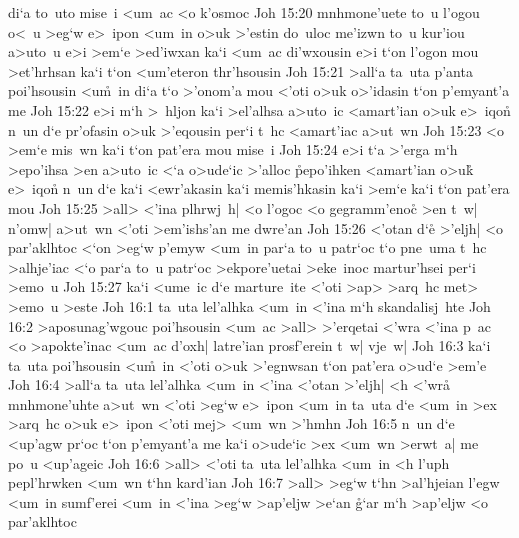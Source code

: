 di`a
to~uto
mise~i
<um~ac
<o
k'osmoc\bibvsend
\vs Joh 15:20
mnhmone'uete
to~u
l'ogou
o<~u
>eg`w
e>~ipon
<um~in
o>uk
>'estin
do~uloc
me'izwn
to~u
kur'iou
a>uto~u
e>i
>em`e
>ed'iwxan
ka`i
<um~ac
di'wxousin
e>i
t`on
l'ogon
mou
>et'hrhsan
ka`i
t`on
<um'eteron
thr'hsousin\bibvsend
\vs Joh 15:21
>all`a
ta~uta
p'anta
poi'hsousin
<u\r{m}~in
di`a
t`o
>'onom'a
mou
<'oti
o>uk
o>'idasin
t`on
p'emyant'a
me\bibvsend
\vs Joh 15:22
e>i
m`h
>~hljon
ka`i
>el'alhsa
a>uto~ic
<amart'ian
o>uk
e>~iqo\r{n}
n~un
d`e
pr'ofasin
o>uk
>'eqousin
per`i
t~hc
<amart'iac
a>ut~wn\bibvsend
\vs Joh 15:23
<o
>em`e
mis~wn
ka`i
t`on
pat'era
mou
mise~i\bibvsend
\vs Joh 15:24
e>i
t`a
>'erga
m`h
>epo'ihsa
>en
a>uto~ic
<`a
o>ude`ic
>'alloc
\r{p}epo'ihken
<amart'ian
o>u\r{k}
e>~iqo\r{n}
n~un
d`e
ka`i
<ewr'akasin
ka`i
memis'hkasin
ka`i
>em`e
ka`i
t`on
pat'era
mou\bibvsend
\vs Joh 15:25
>all>
<'ina
plhrwj~h|
<o
l'ogoc
<o
gegramm'enoc\r{}
>en
t~w|
n'omw|
a>ut~wn
<'oti
>em'ishs'an
me
dwre'an\bibvsend
\vs Joh 15:26
<'otan
d`e\r{}
>'eljh|
<o
par'aklhtoc
<`on
>eg`w
p'emyw
<um~in
par`a
to~u
patr`oc
t`o
pne~uma
t~hc
>alhje'iac
<`o
par`a
to~u
patr`oc
>ekpore'uetai
>eke~inoc
martur'hsei
per`i
>emo~u\bibvsend
\vs Joh 15:27
ka`i
<ume~ic
d`e
marture~ite
<'oti
>ap>
>arq~hc
met>
>emo~u
>este\bibvsend
\vs Joh 16:1
ta~uta
lel'alhka
<um~in
<'ina
m`h
skandalisj~hte\bibvsend
\vs Joh 16:2
>aposunag'wgouc
poi'hsousin
<um~ac
>all>
>'erqetai
<'wra
<'ina
p~ac
<o
>apokte'inac
<um~ac
d'oxh|
latre'ian
prosf'erein
t~w|
vje~w|\bibvsend
\vs Joh 16:3
ka`i
ta~uta
poi'hsousin
<u\r{m}~in
<'oti
o>uk
>'egnwsan
t`on
pat'era
o>ud`e
>em'e\bibvsend
\vs Joh 16:4
>all`a
ta~uta
lel'alhka
<um~in
<'ina
<'otan
>'eljh|
<h
<'wr\r{a}
mnhmone'uhte
a>ut~wn
<'oti
>eg`w
e>~ipon
<um~in
ta~uta
d`e
<um~in
>ex
>arq~hc
o>uk
e>~ipon
<'oti
mej>
<um~wn
>'hmhn\bibvsend
\vs Joh 16:5
n~un
d`e
<up'agw
pr`oc
t`on
p'emyant'a
me
ka`i
o>ude`ic
>ex
<um~wn
>erwt~a|
me
po~u
<up'ageic\bibvsend
\vs Joh 16:6
>all>
<'oti
ta~uta
lel'alhka
<um~in
<h
l'uph
pepl'hrwken
<um~wn
t`hn
kard'ian\bibvsend
\vs Joh 16:7
>all>
>eg`w
t`hn
>al'hjeian
l'egw
<um~in
sumf'erei
<um~in
<'ina
>eg`w
>ap'eljw
>e`an
\r{g}`ar
m`h
>ap'eljw
<o
par'aklhtoc
